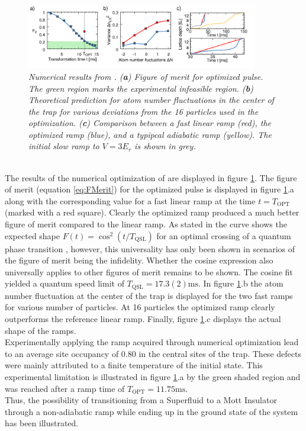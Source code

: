 \begin{figure}[h!]
	\centering
	\includegraphics[width=0.9\textwidth]{Figures/FrankRamp.pdf}
	\caption{\textit{Numerical results from \cite{FrankBloch}. (\textbf{a}) Figure of merit for optimized pulse. The green region marks the experimental infeasible region. (\textbf{b}) Theoretical prediction for atom number fluctuations in the center of the trap for various deviations from the 16 particles used in the optimization. (\textbf{c}) Comparison between a fast linear ramp (red), the optimized ramp (blue), and a typipcal adiabatic ramp (yellow). The initial slow ramp to $V = 3 E_r$ is shown in grey.}}
	\label{fig:FrankRamp}
\end{figure}\\

The results of the numerical optimization of \cite{FrankBloch} are displayed in figure \ref{fig:FrankRamp}. The figure of merit (equation \ref{eq:FMerit}) for the optimized pulse is displayed in figure \ref{fig:FrankRamp}.a along with the corresponding value for a fast linear ramp at the time $t = T_{\mathrm{OPT}}$ (marked with a red square). Clearly the optimized ramp produced a much better figure of merit compared to the linear ramp. As stated in \cite{FrankBloch} the curve shows the expected shape $F(t)= \cos^2\left(t/T_{\mathrm{QSL}}\right)$ for an optimal crossing of a quantum phase transition \cite{Caneva2011}, however, this universality has only been shown in scenarios of the figure of merit being the infidelity. Whether the cosine expression also universally applies to other figures of merit remains to be shown. The cosine fit yielded a quantum speed limit of $T_{\mathrm{QSL}} = 17.3(2) \mathrm{ms}$. In figure \ref{fig:FrankRamp}.b the atom number fluctuation at the center of the trap is displayed for the two fast ramps for various number of particles. At 16 particles the optimized ramp clearly outperforms the reference linear ramp. Finally, figure \ref{fig:FrankRamp}.c displays the actual shape of the ramps.\\

Experimentally applying the ramp acquired through numerical optimization lead to an average site occupancy of 0.80 in the central sites of the trap. These defects were mainly attributed to a finite temperature of the initial state. This experimental limitation is illustrated in figure \ref{fig:FrankRamp}.a by the green shaded region and was reached after a ramp time of $T_{\mathrm{OPT}} = 11.75 \mathrm{ms}$.\\
Thus, the possibility of transitioning from a Superfluid to a Mott Insulator through a non-adiabatic ramp while ending up in the ground state of the system has been illustrated. 